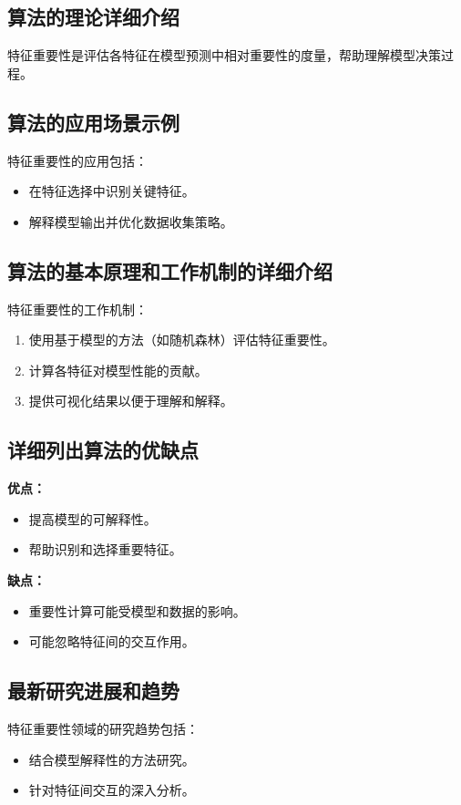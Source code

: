 \subsection*{算法的理论详细介绍}
特征重要性是评估各特征在模型预测中相对重要性的度量，帮助理解模型决策过程。

\subsection*{算法的应用场景示例}
特征重要性的应用包括：
\begin{itemize}
    \item 在特征选择中识别关键特征。
    \item 解释模型输出并优化数据收集策略。
\end{itemize}

\subsection*{算法的基本原理和工作机制的详细介绍}
特征重要性的工作机制：
\begin{enumerate}
    \item 使用基于模型的方法（如随机森林）评估特征重要性。
    \item 计算各特征对模型性能的贡献。
    \item 提供可视化结果以便于理解和解释。
\end{enumerate}

\subsection*{详细列出算法的优缺点}
\textbf{优点：}
\begin{itemize}
    \item 提高模型的可解释性。
    \item 帮助识别和选择重要特征。
\end{itemize}

\textbf{缺点：}
\begin{itemize}
    \item 重要性计算可能受模型和数据的影响。
    \item 可能忽略特征间的交互作用。
\end{itemize}

\subsection*{最新研究进展和趋势}
特征重要性领域的研究趋势包括：
\begin{itemize}
    \item 结合模型解释性的方法研究。
    \item 针对特征间交互的深入分析。
\end{itemize}
